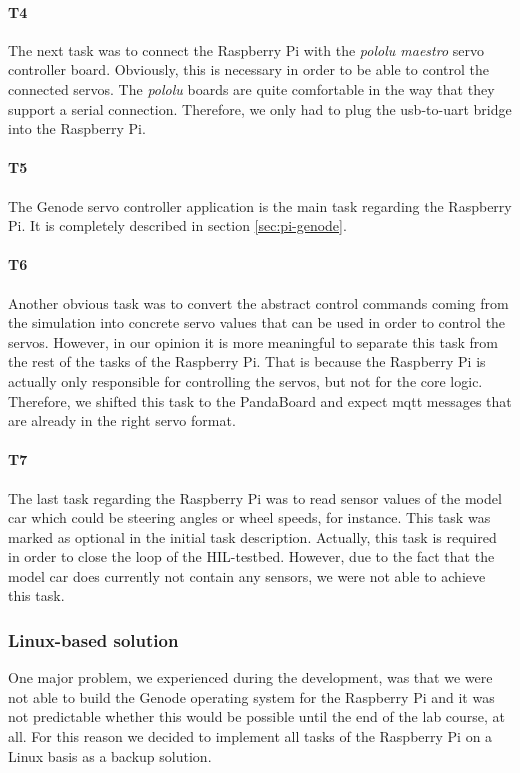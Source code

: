 \paragraph{\textbf{T4}} The next task was to connect the Raspberry Pi with the \textit{pololu maestro} servo controller board. Obviously, this is necessary in order to be able to control the connected servos. The \textit{pololu} boards are quite comfortable in the way that they support a serial connection. Therefore, we only had to plug the usb-to-uart bridge into the Raspberry Pi.

\paragraph{\textbf{T5}} The Genode servo controller application is the main task regarding the Raspberry Pi. It is completely described in section \ref{sec:pi-genode}.

\paragraph{\textbf{T6}} Another obvious task was to convert the abstract control commands coming from the simulation into concrete servo values that can be used in order to control the servos. However, in our opinion it is more meaningful to separate this task from the rest of the tasks of the Raspberry Pi. That is because the Raspberry Pi is actually only responsible for controlling the servos, but not for the core logic. Therefore, we shifted this task to the PandaBoard and expect mqtt messages that are already in the right servo format. 

\paragraph{\textbf{T7}} The last task regarding the Raspberry Pi was to read sensor values of the model car which could be steering angles or wheel speeds, for instance. This task was marked as optional in the initial task description. Actually, this task is required in order to close the loop of the HIL-testbed. However, due to the fact that the model car does currently not contain any sensors, we were not able to achieve this task.


\subsubsection{Linux-based solution}
\label{sec:pi-linux}
One major problem, we experienced during the development, was that we were not able to build the Genode operating system for the Raspberry Pi and it was not predictable whether this would be possible until the end of the lab course, at all. For this reason we decided to implement all tasks of the Raspberry Pi on a Linux basis as a backup solution. \\

